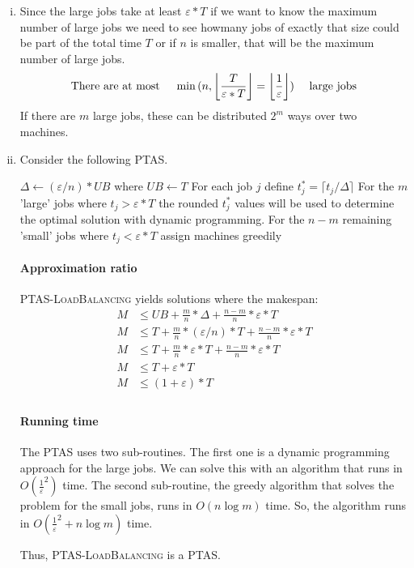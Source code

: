 \begin{enumerate}[(i)]
	\item Since the large jobs take at least $\varepsilon * T$ if we want to know the maximum number of large jobs we need to see howmany jobs of exactly that size could be part of the total time $T$ or if $n$ is smaller, that will be the maximum number of large jobs. 
\[ \text{There are at most \hspace*{10pt}} \min{(n,\left \lfloor\frac{T}{\varepsilon * T} \right \rfloor = \left \lfloor \frac{1}{\varepsilon} \right \rfloor)} \text{\hspace*{10pt} large jobs} \] 
If there are $m$ large jobs, these can be distributed $2^m$ ways over two machines.
	\item Consider the following PTAS.

\begin{sourcecode}
$\Delta \leftarrow (\varepsilon / n) * UB$ where $UB \leftarrow T$ 
For each job $j$ define $t_j^* = \lceil t_j / \Delta \rceil$
For the $m$ 'large' jobs where $t_j > \varepsilon * T$ the rounded $t_j^*$ values will be used to determine the optimal solution with dynamic programming. 
For the $n-m$ remaining 'small' jobs where $t_j < \varepsilon * T$ assign machines greedily 
\qend
\end{sourcecode}

	\paragraph{Approximation ratio} \textsc{PTAS-LoadBalancing} yields solutions where the makespan:
	\begin{align}
		M &\leq UB + \frac{m}{n} * \Delta + \frac{n-m}{n} * \varepsilon * T\\
		M &\leq T + \frac{m}{n} * (\varepsilon / n) * T + \frac{n-m}{n} * \varepsilon * T\\
		M &\leq T + \frac{m}{n} * \varepsilon * T + \frac{n-m}{n} * \varepsilon * T\\
		M &\leq T + \varepsilon * T\\
		M &\leq (1+\varepsilon) * T\\
	\end{align}

	\paragraph{Running time} The PTAS uses two sub-routines.
		The first one is a dynamic programming approach for the large jobs.
		We can solve this with an algorithm that runs in $O(\frac{1}{\varepsilon}^2)$ time.
		The second sub-routine, the greedy algorithm that solves the problem for the small jobs, runs in $O(n\log{m})$ time.
		So, the algorithm runs in $O(\frac{1}{\varepsilon}^2 + n\log{m})$ time.

	Thus, \textsc{PTAS-LoadBalancing} is a PTAS.
\end{enumerate}

